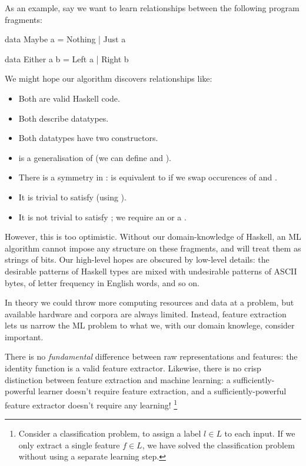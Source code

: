 As an example, say we want to learn relationships between the following program
fragments:

\begin{haskell}
data Maybe a = Nothing | Just a

data Either a b = Left a | Right b
\end{haskell}

We might hope our algorithm discovers relationships like:

\begin{itemize}
  \item Both are valid Haskell code.
  \item Both describe datatypes.
  \item Both datatypes have two constructors.
  \item {} is a generalisation of  (we can define  and ).
  \item There is a symmetry in :  is equivalent to
     if we swap occurences of  and .
  \item It is trivial to satisfy  (using ).
  \item It is not trivial to satisfy ; we require an  or a
    .
\end{itemize}

However, this is too optimistic. Without our domain-knowledge of Haskell, an ML
algorithm cannot impose any structure on these fragments, and will treat them as
strings of bits. Our high-level hopes are obscured by low-level details: the
desirable patterns of Haskell types are mixed with undesirable patterns of ASCII
bytes, of letter frequency in English words, and so on.

In theory we could throw more computing resources and data at a problem, but
available hardware and corpora are always limited. Instead, feature extraction
lets us narrow the ML problem to what we, with our domain knowlege, consider
important.

There is no \emph{fundamental} difference between raw representations and
features: the identity function is a valid feature extractor. Likewise, there is
no crisp distinction between feature extraction and machine learning: a
sufficiently-powerful learner doesn't require feature extraction, and a
sufficiently-powerful feature extractor doesn't require any learning!
\footnote{Consider a classification problem, to assign a label $l \in L$ to each
  input. If we only extract a single feature $f \in L$, we have solved the
  classification problem without using a separate learning step.}

